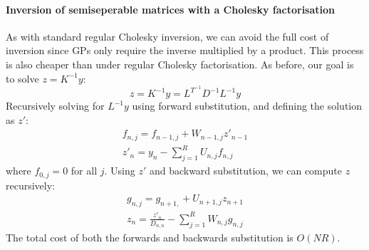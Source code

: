 \paragraph{Inversion of semiseperable matrices with a Cholesky factorisation}
As with standard regular Cholesky inversion, we can avoid the full cost of inversion since GPs only require the inverse multiplied by a product. This process is also cheaper than under regular Cholesky factorisation. As before, our goal is to solve $z = K^{-1} y$:
\begin{equation*}
    z = K^{-1} y = L^{T^{-1}} D^{-1} L^{-1} y
\end{equation*}
Recursively solving for $L^{-1} y$ using forward substitution, and defining the solution as $z'$:
\begin{equation*}
    \begin{aligned}
        f_{n,j} = f_{n-1,j} + W_{n-1,j} z'_{n-1} \\
        z'_n = y_n - \sum_{j=1}^{R} U_{n,j} f_{n,j}
    \end{aligned}
\end{equation*}
where $f_{0,j} = 0$ for all $j$. Using $z'$ and backward substitution, we can compute $z$ recursively:
\begin{equation*}
    \begin{aligned}
        g_{n,j} = g_{n+1,} + U_{n+1,j} z_{n+1} \\
        z_n = \frac{z'_n}{D_{n,n}} - \sum_{j=1}^R W_{n,j} g_{n,j}
    \end{aligned}
\end{equation*}
The total cost of both the forwards and backwards substitution is $O(N R)$.


% 
% 
% 
% 
% 
